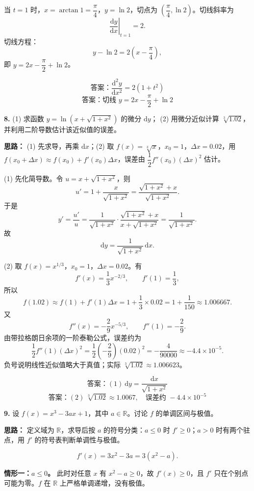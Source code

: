 当 $t=1$ 时，$x=\arctan1=\dfrac{\pi}{4}$，$y=\ln2$，切点为 $\left(\dfrac{\pi}{4},\ln2\right)$。切线斜率为
\[
\left.\frac{\mathrm{d}y}{\mathrm{d}x}\right|_{t=1}=2.
\]
切线方程：
\[
y-\ln2=2\left(x-\frac{\pi}{4}\right),
\]
即 $y=2x-\dfrac{\pi}{2}+\ln2$。

\[
\boxed{\text{答案：}\frac{\mathrm{d}^2y}{\mathrm{d}x^2}=2(1+t^2)}
\]
\[
\boxed{\text{答案：}\text{切线 }y=2x-\frac{\pi}{2}+\ln2}
\]
\else \answerarea[8] \fi%

\textbf{8.} (1) 求函数 $y=\ln\!\left(x+\sqrt{1+x^2}\right)$ 的微分 $\mathrm dy$；
(2) 用微分近似计算 $\sqrt[3]{1.02}$，并利用二阶导数估计该近似值的误差。

\ifshowsolutions%

\textbf{思路：} (1) 先求导，再乘 $\mathrm dx$；(2) 取 $f(x)=\sqrt[3]{x}$，$x_0=1$，$\Delta x=0.02$，用 $f(x_0+\Delta x)\approx f(x_0)+f'(x_0)\Delta x$，误差由 $\dfrac12f''(x_0)(\Delta x)^2$ 估计。

(1) 先化简导数。令 $u=x+\sqrt{1+x^2}$，则
\[
u'=1+\frac{x}{\sqrt{1+x^2}}
=\frac{\sqrt{1+x^2}+x}{\sqrt{1+x^2}}.
\]
于是
\[
y'=\frac{u'}{u}
=\frac{1}{\sqrt{1+x^2}}\cdot
\frac{\sqrt{1+x^2}+x}{x+\sqrt{1+x^2}}
=\frac{1}{\sqrt{1+x^2}}.
\]
故
\[
\mathrm dy=\frac{1}{\sqrt{1+x^2}}\,\mathrm dx.
\]

(2) 取 $f(x)=x^{1/3}$，$x_0=1$，$\Delta x=0.02$。有
\[
f'(x)=\frac13x^{-2/3},\qquad f'(1)=\frac13,
\]
所以
\[
f(1.02)\approx f(1)+f'(1)\Delta x
=1+\frac13\times0.02=1+\frac{1}{150}\approx1.006667.
\]
又
\[
f''(x)=-\frac29x^{-5/3},\qquad f''(1)=-\frac29.
\]
由带拉格朗日余项的一阶泰勒公式，误差约为
\[
\frac12f''(1)(\Delta x)^2
=\frac12\left(-\frac29\right)(0.02)^2
=-\frac{4}{90000}\approx-4.4\times10^{-5}.
\]
负号说明线性近似值略大于真值；实际 $\sqrt[3]{1.02}\approx1.006623$。

\[
\boxed{\text{答案：}(1)\ \mathrm dy=\frac{\mathrm dx}{\sqrt{1+x^2}}}
\]
\[
\boxed{\text{答案：}(2)\ \sqrt[3]{1.02}\approx1.0067,\quad\text{误差约 }-4.4\times10^{-5}}
\]
\else \answerarea[10] \fi%

\textbf{9.} 设 $f(x)=x^3-3ax+1$，其中 $a\in\mathbb R$。讨论 $f$ 的单调区间与极值。

\ifshowsolutions%

\textbf{思路：} 定义域为 $\mathbb R$，求导后按 $a$ 的符号分类：$a\le0$ 时 $f'\ge0$；$a>0$ 时有两个驻点，用 $f'$ 的符号表判断单调性与极值。

\[
f'(x)=3x^2-3a=3(x^2-a).
\]

\textbf{情形一：$a\le0$。} 此时对任意 $x$ 有 $x^2-a\ge0$，故 $f'(x)\ge0$，且 $f'$ 只在个别点可能为零。$f$ 在 $\mathbb R$ 上严格单调递增，没有极值。


